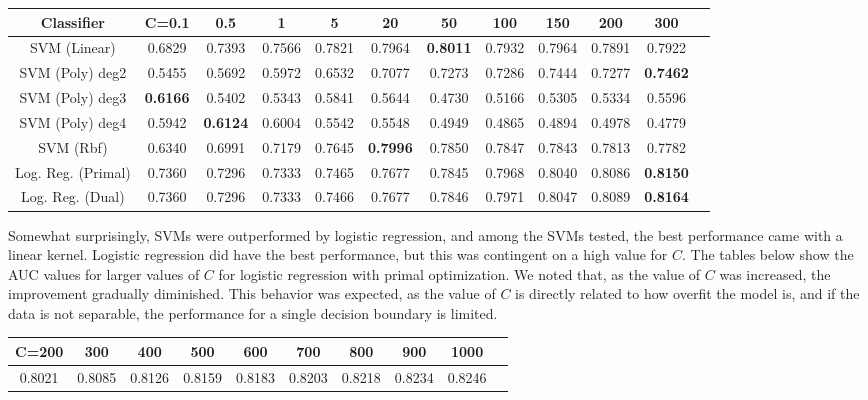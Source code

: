 \documentclass{article} %
\begin{document}
\begin{adjustbox}{width=\textwidth,totalheight=\textheight,keepaspectratio}
\begin{tabular}{c|ccccccccccc}
Classifier & C=0.1 & 0.5 & 1 & 5 & 20 & 50 & 100 & 150 & 200 & 300\\
\hline
SVM (Linear) & 0.6829 & 0.7393 & 0.7566 & 0.7821 & 0.7964 & \textbf{0.8011} & 0.7932 & 0.7964 & 0.7891 & 0.7922\\
SVM (Poly) deg2 & 0.5455 & 0.5692 & 0.5972 & 0.6532 & 0.7077 & 0.7273 & 0.7286 & 0.7444 & 0.7277 & \textbf{0.7462}\\
SVM (Poly) deg3 & \textbf{0.6166} & 0.5402 & 0.5343 & 0.5841 & 0.5644 & 0.4730 & 0.5166 & 0.5305 & 0.5334 & 0.5596\\
SVM (Poly) deg4 & 0.5942 & \textbf{0.6124} & 0.6004 & 0.5542 & 0.5548 & 0.4949 & 0.4865 & 0.4894 & 0.4978 & 0.4779\\
SVM (Rbf) & 0.6340 & 0.6991 & 0.7179 & 0.7645 & \textbf{0.7996} & 0.7850 & 0.7847 & 0.7843 & 0.7813 & 0.7782\\
Log. Reg. (Primal) & 0.7360 & 0.7296 & 0.7333 & 0.7465 & 0.7677 & 0.7845 & 0.7968 & 0.8040 & 0.8086 & \textbf{0.8150}\\
Log. Reg. (Dual) & 0.7360 & 0.7296 & 0.7333 & 0.7466 & 0.7677 & 0.7846 & 0.7971 & 0.8047 & 0.8089 & \textbf{0.8164}\\
\end{tabular}
\end{adjustbox}

Somewhat surprisingly, SVMs were outperformed by logistic regression, and among
the SVMs tested, the best performance came with a linear kernel. Logistic
regression did have the best performance, but this was contingent on a high
value for $C$. The tables below show the AUC values for larger values of $C$ for
logistic regression with primal optimization. We noted that, as the value of $C$
was increased, the improvement gradually diminished. This behavior was expected,
as the value of $C$ is directly related to how overfit the model is, and if the
data is not separable, the performance for a single decision boundary is
limited.

\begin{adjustbox}{width=\textwidth,totalheight=\textheight,keepaspectratio}
\begin{tabular}{cccccccccc}
C=200 & 300 & 400 & 500 & 600 & 700 & 800 & 900 & 1000 \\
\hline
0.8021 & 0.8085 & 0.8126 & 0.8159 & 0.8183 & 0.8203 & 0.8218 & 0.8234 & 0.8246
\end{tabular}
\end{adjustbox}
\end{document}

